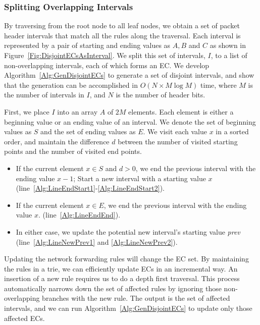 \subsubsection{Splitting Overlapping Intervals}
By traversing from the root node to all leaf nodes, we obtain a set of packet header intervals that match all the rules along the traversal. Each interval is represented by a pair of starting and ending values as $A, B$ and $C$ as shown in Figure~\ref{Fig:DisjointECsAsInterval}. We split this set of intervals, $I$, to a list of non-overlapping intervals, each of which forms an EC. %
We develop Algorithm~\ref{Alg:GenDisjointECs} to generate a set of disjoint intervals, and show that the generation can be accomplished in $O(N \times M\log M)$ time,
where $M$ is the number of intervals in $I$, and $N$ is the number of header bits.

First, we place $I$ into an array $A$ of $2M$ elements. Each element is either a beginning value or an ending value of an interval. We denote the set of beginning values as $S$ and the set of ending values as $E$. We visit each value $x$ in a sorted order, and maintain the difference $d$ between the number of visited starting points and the number of visited end points.
\begin{itemize}
\item If the current element $x \in S$ and $d > 0$,
        we end the previous interval with the ending value $x - 1$;
        Start a new interval with a starting value $x$
        (line~\ref{Alg:LineEndStart1}-\ref{Alg:LineEndStart2}).
\item If the current element $x \in E$, we end the previous interval with the ending value $x$.
        (line~\ref{Alg:LineEndEnd}).
\item In either case, we update the potential new interval's starting value \textit{prev}
        (line~\ref{Alg:LineNewPrev1} and \ref{Alg:LineNewPrev2}).
\end{itemize}

Updating the network forwarding rules will change the EC set.
By maintaining the rules in a trie, we can efficiently update ECs in an incremental way. An insertion of a new rule requires us to do a depth first traversal. This process automatically narrows down the set of affected rules by ignoring those non-overlapping branches with the new rule.
The output is the set of affected intervals, and we can run Algorithm~\ref{Alg:GenDisjointECs} to update only those affected ECs.

